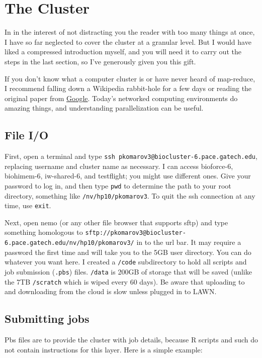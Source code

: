 \documentclass[]{article}
\begin{document}
  \section{The Cluster} \label{cluster}

  In in the interest of not distracting you the reader with too many things at once, I have so far neglected to cover the cluster at a granular level. But I would have liked a compressed introduction myself, and you will need it to carry out the steps in the last section, so I've generously given you this gift.

  If you don't know what a computer cluster is or have never heard of map-reduce, I recommend falling down a Wikipedia rabbit-hole for a few days or reading the original paper from \href{http://research.google.com/archive/mapreduce.html}{Google}. Today's networked computing environments do amazing things, and understanding parallelization can be useful.

  \subsection{File I/O}
  First, open a terminal and type \texttt{ssh pkomarov3@biocluster-6.pace.gatech.edu}, replacing username and cluster name as necessary. I can access bioforce-6, biohimem-6, iw-shared-6, and testflight; you might use different ones. Give your password to log in, and then type \texttt{pwd} to determine the path to your root directory, something like \texttt{/nv/hp10/pkomarov3}. To quit the ssh connection at any time, use \texttt{exit}.

  Next, open nemo (or any other file browser that supports sftp) and type something homologous to \texttt{sftp://pkomarov3@biocluster-6.pace.gatech.edu/nv/hp10/pkomarov3/} in to the url bar. It may require a password the first time and will take you to the 5GB user directory. You can do whatever you want here. I created a \texttt{/code} subdirectory to hold all scripts and job submission (\texttt{.pbs}) files. \texttt{/data} is 200GB of storage that will be saved (unlike the 7TB \texttt{/scratch} which is wiped every 60 days). Be aware that uploading to and downloading from the cloud is slow unless plugged in to LAWN.

  \subsection{Submitting jobs}
  Pbs files are to provide the cluster with job details, because R scripts and such do not contain instructions for this layer. Here is a simple example:
\end{document}
